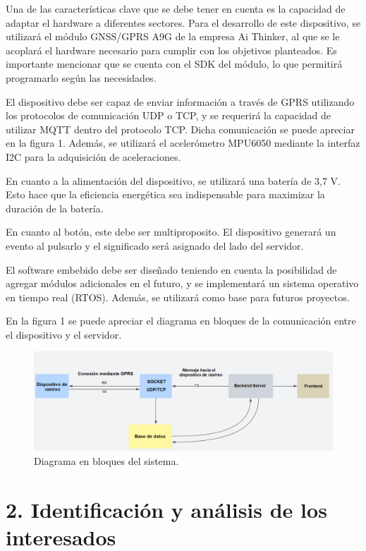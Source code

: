 \documentclass[
11pt, %
codirector, %
]{charter}
\begin{document}
Una de las características clave que se debe tener en cuenta es la capacidad de adaptar el hardware a diferentes sectores. Para el desarrollo de este dispositivo, se utilizará el módulo GNSS/GPRS A9G de la empresa Ai Thinker, al que se le acoplará el hardware necesario para cumplir con los objetivos planteados. Es importante mencionar que se cuenta con el SDK del módulo, lo que permitirá programarlo según las necesidades.

El dispositivo debe ser capaz de enviar información a través de GPRS utilizando los protocolos de comunicación UDP o TCP, y se requerirá la capacidad de utilizar MQTT dentro del protocolo TCP. Dicha comunicación se puede apreciar en la figura 1. Además, se utilizará el acelerómetro MPU6050 mediante la interfaz I2C para la adquisición de aceleraciones.

En cuanto a la alimentación del dispositivo, se utilizará una batería de 3,7 V. Esto hace que la eficiencia energética sea indispensable para maximizar la duración de la batería.

En cuanto al botón, este debe ser multiproposito. El dispositivo generará un evento al pulsarlo y el significado será asignado del lado del servidor.

El software embebido debe ser diseñado teniendo en cuenta la posibilidad de agregar módulos adicionales en el futuro, y se implementará un sistema operativo en tiempo real (RTOS). Además, se utilizará como base para futuros proyectos.

En la figura 1 se puede apreciar el diagrama en bloques de la comunicación entre el dispositivo y el servidor.


\begin{figure}[htpb]
\centering 
\includegraphics[width=1\textwidth]{./Figuras/diagBloque.png}
\caption{Diagrama en bloques del sistema.}
\label{fig:diagBloques}
\end{figure}

\vspace{30px}
\pagebreak
\section{2. Identificación y análisis de los interesados}
\label{sec:interesados}
\end{document}
